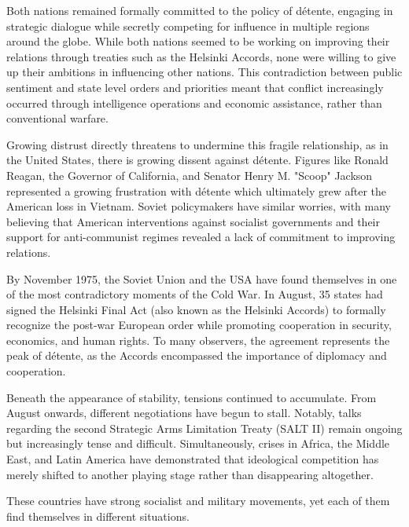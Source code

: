 Both nations remained formally committed to the policy of détente, engaging in strategic dialogue while secretly competing for influence in multiple regions around the globe. While both nations seemed to be working on improving their relations through treaties such as the Helsinki Accords, none were willing to give up their ambitions in influencing other nations. This contradiction between public sentiment and state level orders and priorities meant that conflict increasingly occurred through intelligence operations and economic assistance, rather than conventional warfare.

Growing distrust directly threatens to undermine this fragile relationship, as in the United States, there is growing dissent against détente. Figures like Ronald Reagan, the Governor of California, and Senator Henry M. "Scoop" Jackson represented a growing frustration with détente which ultimately grew after the American loss in Vietnam. Soviet policymakers have similar worries, with many believing that American interventions against socialist governments and their support for anti-communist regimes revealed a lack of commitment to improving relations.


By November 1975, the Soviet Union and the USA have found themselves in one of the most contradictory moments of the Cold War. In August, 35 states had signed the Helsinki Final Act (also known as the Helsinki Accords) to formally recognize the post-war European order while promoting cooperation in security, economics, and human rights. To many observers, the agreement represents the peak of détente, as the Accords encompassed the importance of diplomacy and cooperation.

Beneath the appearance of stability, tensions continued to accumulate. From August onwards, different negotiations have begun to stall. Notably, talks regarding the second Strategic Arms Limitation Treaty (SALT II) remain ongoing but increasingly tense and difficult. Simultaneously, crises in Africa, the Middle East, and Latin America have demonstrated that ideological competition has merely shifted to another playing stage rather than disappearing altogether.


These countries have strong socialist and military movements, yet each of them find themselves in different situations.

